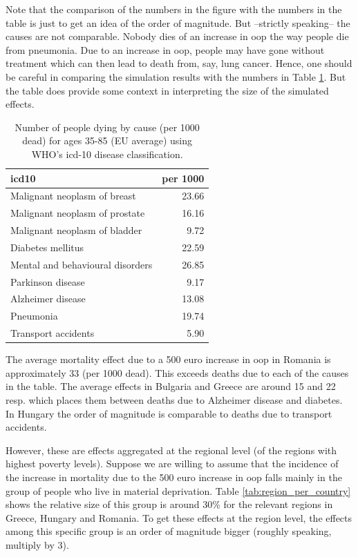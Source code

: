 \documentclass[a4paper,12pt]{article}
\begin{document}
Note that the comparison of the numbers in the figure with the numbers in the table is just to get an idea of the order of magnitude. But --strictly speaking-- the causes are not comparable. Nobody dies of an increase in oop the way people die from pneumonia. Due to an increase in oop, people may have gone without treatment which can then lead to death from, say, lung cancer. Hence, one should be careful in comparing the simulation results with the numbers in Table \ref{tab:causes_death}. But the table does provide some context in interpreting the size of the simulated effects.

\begin{table}[htbp]
\caption{\label{tab:causes_death}Number of people dying by cause (per 1000 dead) for ages 35-85 (EU average) using WHO's icd-10 disease classification.}
\centering
\begin{tabular}{lr}
icd10 & per 1000\\[0pt]
\hline
Malignant neoplasm of breast & 23.66\\[0pt]
Malignant neoplasm of prostate & 16.16\\[0pt]
Malignant neoplasm of bladder & 9.72\\[0pt]
Diabetes mellitus & 22.59\\[0pt]
Mental and behavioural disorders & 26.85\\[0pt]
Parkinson disease & 9.17\\[0pt]
Alzheimer disease & 13.08\\[0pt]
Pneumonia & 19.74\\[0pt]
Transport accidents & 5.90\\[0pt]
\end{tabular}
\end{table}

The average mortality effect due to a 500 euro increase in oop in Romania is approximately 33 (per 1000 dead). This exceeds deaths due to each of the causes in the table. The average effects in Bulgaria and Greece are around 15 and 22 resp. which places them between deaths due to Alzheimer disease and diabetes. In Hungary the order of magnitude is comparable to deaths due to transport accidents.

However, these are effects aggregated at the regional level (of the regions with highest poverty levels). Suppose we are willing to assume that the incidence of the increase in mortality due to the 500 euro increase in oop falls mainly in the group of people who live in material deprivation. Table \ref{tab:region_per_country} shows the relative size of this group is around 30\% for the relevant regions in Greece, Hungary and Romania. To get these effects at the region level, the effects among this specific group is an order of magnitude bigger (roughly speaking, multiply by 3).
\end{document}
